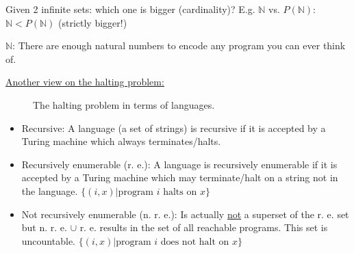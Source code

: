 \par{
	\noindent
	Given 2 infinite sets: which one is bigger (cardinality)? \newline
	E.g. $\mathbb{N}$ vs. $P(\mathbb{N})$: $\mathbb{N} < P(\mathbb{N})$ (strictly bigger!)
}

\par{
	\noindent
	$\mathbb{N}$: There are enough natural numbers to encode any program you can ever think of. \newline
}

\par{
	\noindent\underline{Another view on the halting problem:}
	\begin{figure}[!htb]
		\centering
		\caption{The halting problem in terms of languages.}
		\label{fig:diffviewhaltingprob}
	\end{figure}
	\begin{itemize}
		\item{
			Recursive: \newline
			A language (a set of strings) is recursive if it is accepted by a Turing machine which always terminates/halts.
		}
		\item{
			Recursively enumerable (r. e.): \newline
			A language is recursively enumerable if it is accepted by a Turing machine which may terminate/halt on a string not in the language.
			$\{(i, x) | \text{program } i \text{ halts on } x\}$
		}
		\item{
			Not recursively enumerable (n. r. e.): \newline
			Is actually \underline{not} a superset of the r. e. set but n. r. e. $\cup$ r. e. results in the set of all reachable programs. This set is uncountable.
			$\{(i, x) | \text{program } i \text{ does not halt on } x\}$
		}
	\end{itemize}
}

